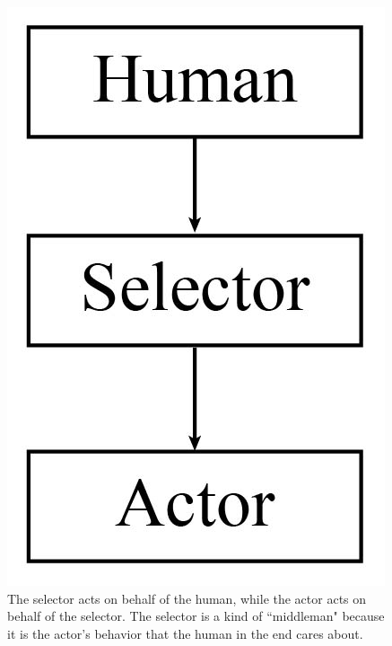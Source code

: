 \begin{figure}
	\begin{minipage}{0.4\linewidth}
		\includegraphics[width=1\linewidth]{"images/conceptual-diagrams/human-selector-actor-box-01"}
	\end{minipage}\hfill
	\begin{minipage}{0.60\linewidth}
		\captionsetup{labelfont=bf,font=small,labelsep=period}
		\caption{\rightskip=10pt\leftskip=10pt The selector acts on behalf of the human, while the actor acts on behalf of the selector. The selector is a kind of ``middleman" because it is the actor's behavior that the human in the end cares about. 
		}
		\label{fig:causaldiagramexplanation} 	
	\end{minipage}
\end{figure}


